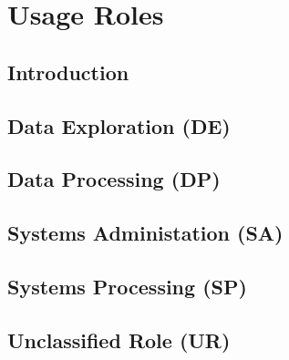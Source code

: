 \section{Usage Roles}

\thispagestyle{section_start_style}

\subsection{Introduction}

\subsection{Data Exploration (DE)}

\subsection{Data Processing (DP)}

\subsection{Systems Administation (SA)}

\subsection{Systems Processing (SP)}

\subsection{Unclassified Role (UR)}